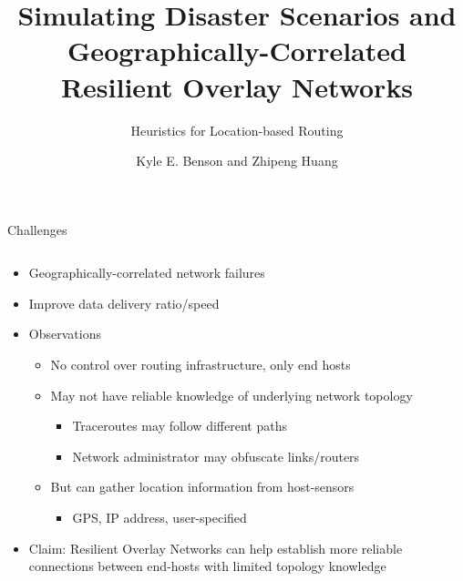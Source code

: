 \documentclass[pdftex]{beamer}
\begin{document}
\title[Short Title]{Simulating Disaster Scenarios and Geographically-Correlated Resilient Overlay Networks}
\subtitle{Heuristics for Location-based Routing}
\author[K. Benson and Z. Huang]{Kyle E. Benson and Zhipeng Huang}


\begin{frame}[plain]
	\titlepage
\end{frame}


\begin{frame}{Challenges}
\begin{columns}
\begin{column}{\textwidth}
\begin{itemize}
	\item Geographically-correlated network failures
	\item Improve data delivery ratio/speed
	\item Observations
        \begin{itemize}
        	\item No control over routing infrastructure, only end hosts
		\item May not have reliable knowledge of underlying network topology
                \begin{itemize}
        		\item Traceroutes may follow different paths
			\item Network administrator may obfuscate links/routers
                \end{itemize}
		\item But can gather location information from host-sensors
                \begin{itemize}
        		\item GPS, IP address, user-specified
                \end{itemize}
        \end{itemize}
	\item Claim: Resilient Overlay Networks can help establish more reliable connections between end-hosts with limited topology knowledge
\end{itemize}
\end{column}
\end{columns}
\end{frame}
\end{document}
